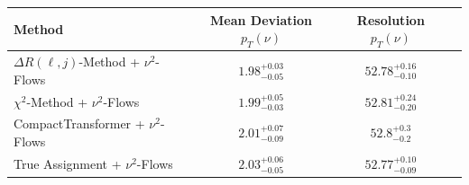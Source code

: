     \begin{tabular}{lccc}
        \toprule
        Method & Mean Deviation $p_{T}({\nu})$ & Resolution $p_{T}({\nu})$ \\
        \midrule
        $\Delta R(\ell,j)$-Method + $\nu^2$-Flows & $1.98^{+0.03}_{-0.05}$ & $52.78^{+0.16}_{-0.10}$ \\
        $\chi^2$-Method + $\nu^2$-Flows & $1.99^{+0.05}_{-0.03}$ & $52.81^{+0.24}_{-0.20}$ \\
        CompactTransformer + $\nu^2$-Flows & $2.01^{+0.07}_{-0.09}$ & $52.8^{+0.3}_{-0.2}$ \\
        True Assignment + $\nu^2$-Flows & $2.03^{+0.06}_{-0.05}$ & $52.77^{+0.10}_{-0.09}$ \\
        \bottomrule
    \end{tabular}